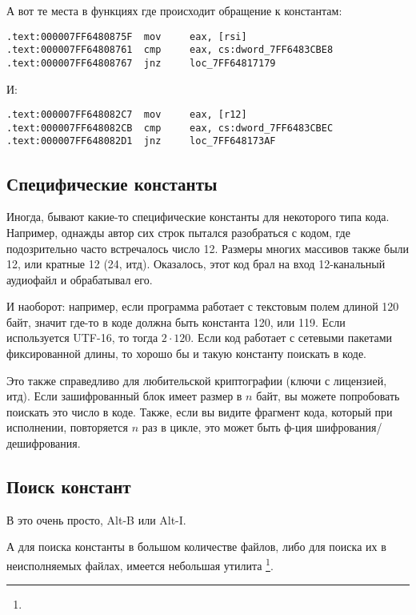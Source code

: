 А вот те места в функциях где происходит обращение к константам:

\begin{lstlisting}[caption=dhcpcore.dll (Windows 7 x64),style=customasm]
.text:000007FF6480875F  mov     eax, [rsi]
.text:000007FF64808761  cmp     eax, cs:dword_7FF6483CBE8
.text:000007FF64808767  jnz     loc_7FF64817179
\end{lstlisting}

И:

\begin{lstlisting}[caption=dhcpcore.dll (Windows 7 x64),style=customasm]
.text:000007FF648082C7  mov     eax, [r12]
.text:000007FF648082CB  cmp     eax, cs:dword_7FF6483CBEC
.text:000007FF648082D1  jnz     loc_7FF648173AF
\end{lstlisting}

\subsection{Специфические константы}

Иногда, бывают какие-то специфические константы для некоторого типа кода.
Например, однажды автор сих строк пытался разобраться с кодом, где подозрительно часто встречалось число 12.
Размеры многих массивов также были 12, или кратные 12 (24, итд).
Оказалось, этот код брал на вход 12-канальный аудиофайл и обрабатывал его.

И наоборот: например, если программа работает с текстовым полем длиной 120 байт, значит где-то в коде должна
быть константа 120, или 119.
Если используется UTF-16, то тогда $2 \cdot 120$.
Если код работает с сетевыми пакетами фиксированной длины, то хорошо бы и такую константу поискать в коде.

Это также справедливо для любительской криптографии (ключи с лицензией, итд).
Если зашифрованный блок имеет размер в $n$ байт, вы можете попробовать поискать это число в коде.
Также, если вы видите фрагмент кода, который при исполнении, повторяется $n$ раз в цикле,
это может быть ф-ция шифрования/дешифрования.

\subsection{Поиск констант}

В \IDA это очень просто, Alt-B или Alt-I.

А для поиска константы в большом количестве файлов, либо для поиска их в неисполняемых файлах, имеется небольшая утилита
\footnote{\BGREPURL}.

